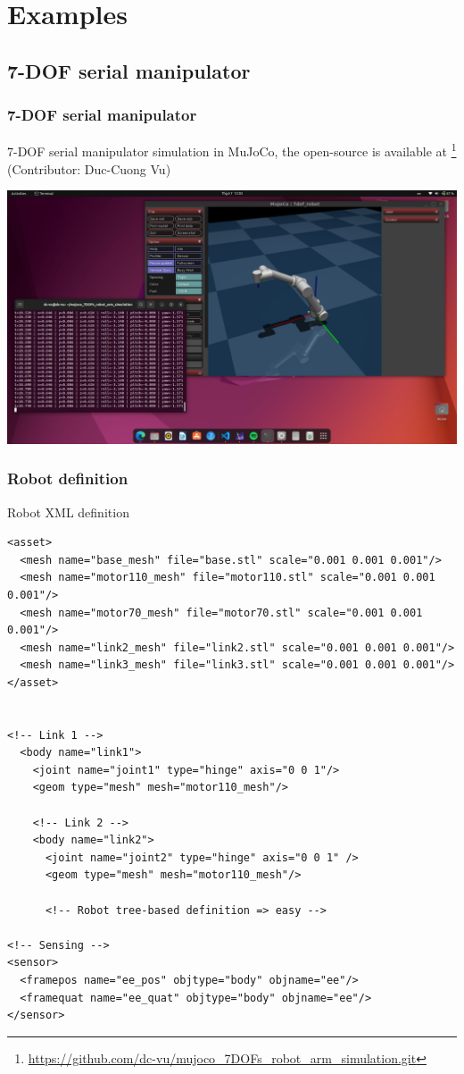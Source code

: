 \documentclass[9pt]{beamer}
\begin{document}
	
	\section{Examples}
		\subsection{7-DOF serial manipulator}
		
		\begin{frame}
			\frametitle{7-DOF serial manipulator}
			7-DOF serial manipulator simulation in MuJoCo, the open-source is available at \footnote{\href{https://github.com/dc-vu/mujoco_7DOFs_robot_arm_simulation.git}{https://github.com/dc-vu/mujoco\_7DOFs\_robot\_arm\_simulation.git}} (Contributor: Duc-Cuong Vu)
			\begin{center}
				\includegraphics[width=0.9\linewidth]{images/mjc-7dof}
			\end{center}
			
		\end{frame}
	
	
		\begin{frame}[fragile]
			\frametitle{Robot definition}
			Robot XML definition
		\begin{verbatim}
<asset>
  <mesh name="base_mesh" file="base.stl" scale="0.001 0.001 0.001"/>
  <mesh name="motor110_mesh" file="motor110.stl" scale="0.001 0.001 0.001"/>
  <mesh name="motor70_mesh" file="motor70.stl" scale="0.001 0.001 0.001"/>
  <mesh name="link2_mesh" file="link2.stl" scale="0.001 0.001 0.001"/>
  <mesh name="link3_mesh" file="link3.stl" scale="0.001 0.001 0.001"/>
</asset>

 
<!-- Link 1 -->
  <body name="link1">
    <joint name="joint1" type="hinge" axis="0 0 1"/>
    <geom type="mesh" mesh="motor110_mesh"/>

    <!-- Link 2 -->
    <body name="link2"> 
      <joint name="joint2" type="hinge" axis="0 0 1" />
      <geom type="mesh" mesh="motor110_mesh"/>
      
      <!-- Robot tree-based definition => easy -->
      
<!-- Sensing -->
<sensor>
  <framepos name="ee_pos" objtype="body" objname="ee"/>
  <framequat name="ee_quat" objtype="body" objname="ee"/>
</sensor>
		\end{verbatim}
		\end{frame}
	
\end{document}
